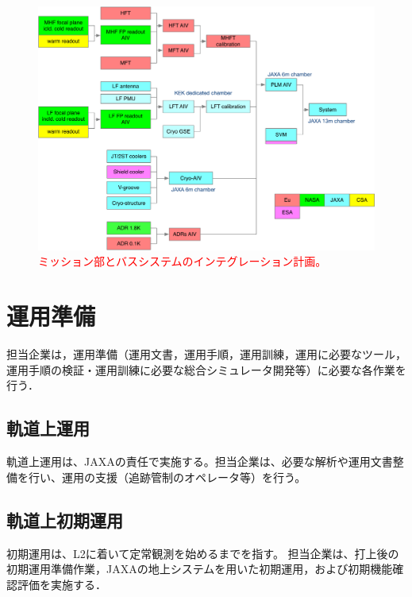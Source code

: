 \documentclass[xelatex,ja=standard]{bxjsarticle}
\newcommand{\red}[1]{\textcolor{red}{#1}}
\begin{document}
\begin{figure} [hbt]
    \centering
    \includegraphics[width=12cm]{BUS-SoW/Figures/integration-scheme.pdf}
    \caption{\red{ミッション部とバスシステムのインテグレーション計画。}}
    \label{fig:integration-scheme}
\end{figure}

\section{運用準備}

担当企業は，運用準備（運用文書，運用手順，運用訓練，運用に必要なツール，運用手順の検証・運用訓練に必要な総合シミュレータ開発等）に必要な各作業を行う．

\subsection{軌道上運用}

軌道上運用は、JAXAの責任で実施する。担当企業は、必要な解析や運用文書整備を行い、運用の支援（追跡管制のオペレータ等）を行う。

\subsection{軌道上初期運用}
初期運用は、L2に着いて定常観測を始めるまでを指す。
担当企業は、打上後の初期運用準備作業，JAXAの地上システムを用いた初期運用，および初期機能確認評価を実施する．
\end{document}
